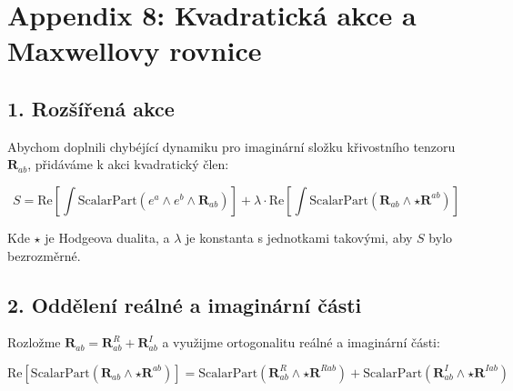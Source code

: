 

\appendix

\section*{Appendix 8: Kvadratick\'a akce a Maxwellovy rovnice}


\subsection*{1. Roz\v{s}\'{i}\v{r}en\'a akce}

Abychom doplnili chyb\'ej\'ic\'i dynamiku pro imagin\'arn\'i slo\v{z}ku k\v{r}ivostn\'iho tenzoru \( \mathbf{R}_{ab} \), p\v{r}id\'av\'ame k akci kvadratick\'y \v{c}len:

\begin{equation}
S = \text{Re} \left[ \int \text{ScalarPart} \left( e^a \wedge e^b \wedge \mathbf{R}_{ab} \right) \right] + \lambda \cdot \text{Re} \left[ \int \text{ScalarPart} \left( \mathbf{R}_{ab} \wedge \star \mathbf{R}^{ab} \right) \right]
\end{equation}

Kde \( \star \) je Hodgeova dualita, a \( \lambda \) je konstanta s jednotkami takov\'ymi, aby \( S \) bylo bezrozm\v{e}rn\'e.

\subsection*{2. Odd\v{e}len\'i re\'aln\'e a imagin\'arn\'i \v{c}\'asti}

Rozlo\v{z}me \( \mathbf{R}_{ab} = \mathbf{R}^R_{ab} + \mathbf{R}^I_{ab} \) a vyu\v{z}ijme ortogonalitu re\'aln\'e a imagin\'arn\'i \v{c}\'asti:

\begin{equation}
\text{Re} \left[ \text{ScalarPart}( \mathbf{R}_{ab} \wedge \star \mathbf{R}^{ab} ) \right] = \text{ScalarPart}( \mathbf{R}^R_{ab} \wedge \star \mathbf{R}^{R ab} ) + \text{ScalarPart}( \mathbf{R}^I_{ab} \wedge \star \mathbf{R}^{I ab} )
\end{equation}

